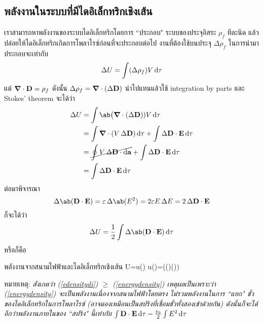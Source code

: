 \subsection{พลังงานในระบบที่มีไดอิเล็กทริกเชิงเส้น}
เราสามารถหาพลังงานของระบบไดอิเล็กทริกโดยการ ``ประกอบ" ระบบของประจุอิสระ $\rho_f$ ทีละนิด แล้วปล่อยให้ไดอิเล็กทริกเกิดการโพลาไรซ์ก่อนที่จะประกอบต่อไป งานที่ต้องใช้บนประจุ $\Delta \rho_f$ ในการนำมาประกอบจะเท่ากับ
\[
\Delta U=\int(\Delta\rho_f)V\odif{\tau}
\]
แต่ $\boldsymbol{\nabla}\cdot\mathbf{D}=\rho_f$ ดังนั้น $\Delta\rho_f=\boldsymbol{\nabla}\cdot(\Delta\mathbf{D})$ นำไปแทนแล้วใช้ integration by parts และ Stokes' theorem จะได้ว่า
\begin{align*}
    \Delta U&=\int\ab\big(\gd\cdot(\Delta\vb{D}))V\odif{\tau}\\
    &=\int\gd\cdot(V\,\Delta\vb{D})\odif{\tau}+\int\Delta\vb{D}\cdot\vb{E}\odif{\tau}\\
    &=\cancel{\oint V\,\Delta\vb{D}\cdot\odif{\vb{a}}}+\int\Delta\vb{D}\cdot\vb{E}\odif{\tau}\\
    &=\int\Delta\vb{D}\cdot\vb{E}\odif{\tau}
\end{align*}
ต่อมาพิจารณา
\[
\Delta\ab(\vb{D}\cdot\vb{E})=\eps\,\Delta\ab(E^2)=2\eps E\,\Delta E=2\,\Delta\vb{D}\cdot\vb{E}
\]
ก็จะได้ว่า
\[
\Delta U=\frac{1}{2}\int\Delta\ab(\vb{D}\cdot\vb{E})\odif{\tau}
\]
หรือก็คือ
\begin{ieqbox}{พลังงานจากสนามไฟฟ้าและไดอิเล็กทริกเชิงเส้น}
    U=\int u()\odif{\tau} u()=\ab\Big(()\cdot{}())\label{edensitydi}
\end{ieqbox}
หมายเหตุ: \emph{สังเกตว่า (\ref{edensitydi}) $\geq$ (\ref{energydensity}) เหตุผลเป็นเพราะว่า (\ref{energydensity}) จะเป็นพลังงานเนื่องจากสนามไฟฟ้าโดยตรง ไม่รวมพลังงานในการ ``แยก" ขั้วของไดอิเล็กทริกในการโพลาไรซ์ (อาจมองเหมือนเป็นสปริงที่เชื่อมขั้วทั้งสองเข้าด้วยกัน) ดังนั้นก็จะได้อีกว่าพลังงานภายในของ ``สปริง" นี้เท่ากับ $\int \vb{D}\cdot\vb{E}\odif{\tau} - \frac{\eps_0}{2}\int E^2\odif{\tau}$} 
